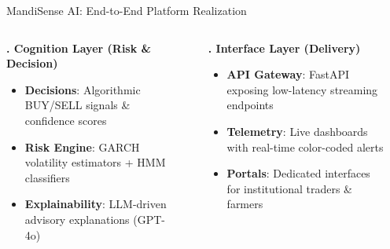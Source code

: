 \documentclass{beamer}
\begin{document}
\begin{frame}{MandiSense AI: End-to-End Platform Realization}
\begin{columns}[T]
    \begin{smallcard}[0.98\textwidth, top=1.5pt, bottom=1.5pt, left=4pt, right=4pt, boxsep=0.5pt]
        \textbf{\textcolor{accentTeal}{\fontsize{6.5pt}{7.5pt}. Cognition Layer (Risk \& Decision)}}
        \vspace{0.02cm}
        \begin{itemize}\setlength\itemsep{0.5pt}\setlength\parskip{0pt}
            \tiny
            \item \textbf{Decisions}: Algorithmic BUY/SELL signals \& confidence scores
            \item \textbf{Risk Engine}: GARCH volatility estimators + HMM classifiers
            \item \textbf{Explainability}: LLM-driven advisory explanations (GPT-4o)
        \end{itemize}
    \end{smallcard}
    
    \vspace{-0.02cm}
    {\centering\textcolor{primaryLight}{\fontsize{5pt}{6pt}\selectfont {}}\par}
    \vspace{-0.02cm}
    
    \begin{smallcard}[0.98\textwidth, top=1.5pt, bottom=1.5pt, left=4pt, right=4pt, boxsep=0.5pt]
        \textbf{\textcolor{accentTeal}{\fontsize{6.5pt}{7.5pt}. Interface Layer (Delivery)}}
        \vspace{0.02cm}
        \begin{itemize}\setlength\itemsep{0.5pt}\setlength\parskip{0pt}
            \tiny
            \item \textbf{API Gateway}: FastAPI exposing low-latency streaming endpoints
            \item \textbf{Telemetry}: Live dashboards with real-time color-coded alerts
            \item \textbf{Portals}: Dedicated interfaces for institutional traders \& farmers
        \end{itemize}
    \end{smallcard}
    
    \vspace{-0.02cm}
    {\centering\textcolor{primaryLight}{\fontsize{5pt}{6pt}\selectfont {}}\par}
    \vspace{-0.02cm}
    

\end{columns}
\end{frame}
\end{document}
